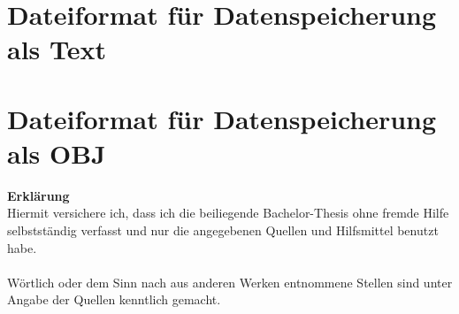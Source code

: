 \documentclass[a4paper,12pt,bibliography=totoc, listof=totoc,titlepage,pointlessnumbers]{scrreprt}
\begin{document}
\begin{appendices}
\section{Dateiformat für Datenspeicherung als Text}
\label{a:AusgabeTXT}


\section{Dateiformat für Datenspeicherung als OBJ}
\label{a:AusgabeOBJ}



\end{appendices}

\newpage
\thispagestyle{empty}
\noindent\textbf{\large Erklärung}\\
Hiermit versichere ich, dass ich die beiliegende Bachelor-Thesis ohne fremde Hilfe selbst\-stän\-dig verfasst und nur die angegebenen Quellen und Hilfsmittel benutzt habe.\\
\\
Wörtlich oder dem Sinn nach aus anderen Werken entnommene Stellen sind unter Angabe der Quellen kenntlich gemacht. 
\\
\\
\\
\\
\\
\end{document}
